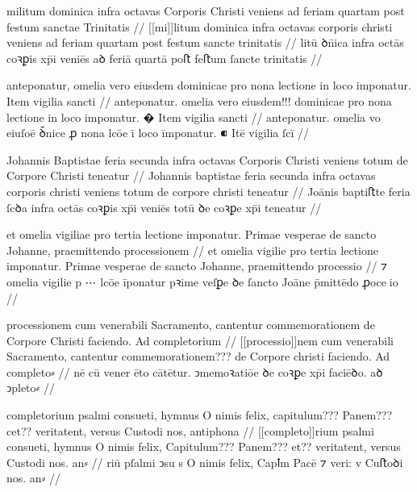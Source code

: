 \ex \bg
\gla
{}
militum dominica infra octavas Corporis 
Christi veniens ad feriam quartam post festum sanctae Trinitatis
//
\glRekonstrukcja
{}
[[mi]]litum dominica infra octavas corporis 
christi veniens ad feriam quartam post festum sancte trinitatis
//
\glU
{}
litū ꝺn̄ica infra octās coꝛꝑis xp̄i veniēs aꝺ feriā quartā poﬅ feﬅum ſancte trinitatis
//
\endgl
\eg


\ex \bg
\gla
{}
anteponatur, omelia vero eiusdem dominicae pro nona lectione in loco imponatur.
{} Item vigilia sancti
//
\glRekonstrukcja
{}
anteponatur. omelia vero eiusdem!!! dominicae pro nona lectione in loco imponatur.
� Item vigilia sancti
//
\glU
{}
anteponatur. omelia vo eiuſoē ꝺ̄nice ꝓ nona lcōe ī loco īmponatur. ⁌ Itē vigilia ſcī
//
\endgl
\eg



\ex \bg
\gla
{}
Johannis Baptistae feria secunda infra octavas
Corporis Christi veniens totum de Corpore Christi teneatur
//
\glRekonstrukcja
{}
Johannis baptistae feria secunda infra octavas
corporis christi veniens totum de corpore christi teneatur
//
\glU
{}
Joānis baptiﬅte feria ſcꝺa infra octās coꝛꝑis xp̄i veniēs totū ꝺe coꝛꝑe xp̄i teneatur
//
\endgl
\eg



\ex \bg
\gla
{}
et omelia
vigiliae pro tertia lectione imponatur. Primae vesperae de sancto Johanne,
praemittendo processionem
//
\glRekonstrukcja
{}
et omelia
vigilie pro tertia lectione imponatur. Primae vesperae de sancto Johanne,
praemittendo processio
//
\glU
{}
⁊ omelia vigilie p ⋯ lcōe īponatur pꝛime veſꝑe ꝺe ſancto Joāne p̄mittēdo ꝓoceio
//
\endgl
\eg



\ex \bg
\gla
{}
processionem cum venerabili Sacramento, cantentur commemorationem de Corpore Christi faciendo. Ad completorium
//
\glRekonstrukcja
{}
[[processio]]nem cum venerabili Sacramento, cantentur commemorationem??? de Corpore christi faciendo. Ad completo⸗
//
\glU
{}
nē cū vener ēto cātētur. ↄmemoꝛatiōe ꝺe coꝛꝑe xp̄i faciēꝺo. aꝺ ↄpleto⸗
//
\endgl
\eg



\ex \bg
\gla
{}
completorium psalmi
consueti, hymnus O nimis felix, capitulum??? Panem??? cet?? veritatent, versus
Custodi nos, antiphona
//
\glRekonstrukcja
{}
[[completo]]rium psalmi
consueti, hymnus O nimis felix, Capitulum??? Panem??? et?? veritatent, versus
Custodi nos. an⸗
//
\glU
{}
riū pſalmi ↄsu s O nimis felix, Capꝉm Pacē ⁊ veri: v Cuﬅoꝺi nos. an⸗
//
\endgl
\eg




